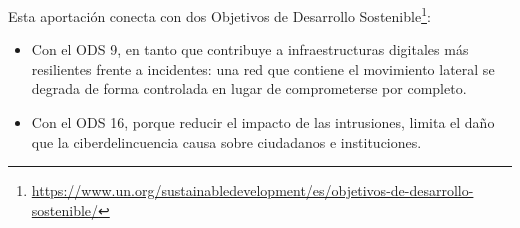 \documentclass[11pt,spanish,listoffigures,listoftables]{tfgetsinf}
\begin{document}
        Esta aportación conecta con dos Objetivos de Desarrollo Sostenible\footnote{\url{https://www.un.org/sustainabledevelopment/es/objetivos-de-desarrollo-sostenible/}}: 
        \begin{itemize}
            \item  Con el ODS 9, en tanto que contribuye a infraestructuras digitales más resilientes frente a incidentes: una red que contiene el movimiento lateral se degrada de forma controlada en lugar de comprometerse por completo.
            \item Con el ODS 16, porque reducir el impacto de las intrusiones, limita el daño que la ciberdelincuencia causa sobre ciudadanos e instituciones.
        \end{itemize}

\end{document}

